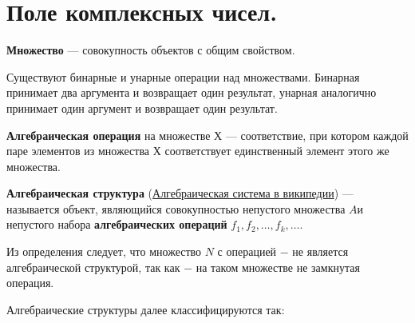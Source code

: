\section{Поле комплексных чисел.}

{\bf Множество} --- совокупность объектов с общим свойством.

Существуют бинарные и унарные операции над множествами. Бинарная принимает два аргумента и возвращает один результат, унарная аналогично принимает один аргумент и возвращает один результат.

\down

{\bf Алгебраическая операция} на множестве $Х$ --- соответствие, при котором каждой паре элементов из множества $Х$ соответствует единственный элемент этого же множества.



{\bf Алгебраическая структура} (\href{https://ru.wikipedia.org/wiki/%D0%90%D0%BB%D0%B3%D0%B5%D0%B1%D1%80%D0%B0%D0%B8%D1%87%D0%B5%D1%81%D0%BA%D0%B0%D1%8F_%D1%81%D0%B8%D1%81%D1%82%D0%B5%D0%BC%D0%B0}{Алгебраическая система в википедии}) --- называется объект, являющийся совокупностью непустого множества $A$и непустого набора {\bf алгебраических операций} $f_1, f_2, \dots, f_k, \dots$.

 Из определения следует, что множество $N$ с операцией $-$ не является алгебраической структурой, так как $-$ на таком множестве не замкнутая операция.

\down

Алгебраические структуры далее классифицируются так:

